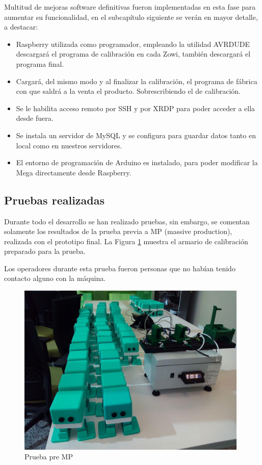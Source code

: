 Multitud de mejoras software definitivas fueron implementadas en esta fase para aumentar su funcionalidad, en el subcapítulo siguiente se verán en mayor detalle, a destacar:
\begin{itemize}
  \item Raspberry utilizada como programador, empleando la utilidad AVRDUDE descargará el programa de calibración en cada Zowi, también descargará el programa final.
  \item Cargará, del mismo modo y al finalizar la calibración, el programa de fábrica con que saldrá a la venta el producto. Sobrescribiendo el de calibración.
  \item Se le habilita acceso remoto por SSH y por XRDP para poder acceder a ella desde fuera.
  \item Se instala un servidor de MySQL y se configura para guardar datos tanto en local como en nuestros servidores.
  \item El entorno de programación de Arduino es instalado, para poder modificar la Mega directamente desde Raspberry.
\end{itemize}


\subsection{Pruebas realizadas}


Durante todo el desarrollo se han realizado pruebas, sin embargo, se comentan solamente los resultados de la prueba previa a MP (massive production), realizada con el prototipo final. La Figura \ref{fig:pre-mp} muestra el armario de calibración preparado para la prueba.

Los operadores durante esta prueba fueron personas que no habían tenido contacto alguno con la máquina.
\begin{figure}
\centering
\includegraphics[width=110mm]{Figures/pre-mp}
\caption{Prueba pre MP}
\label{fig:pre-mp}
\end{figure}

